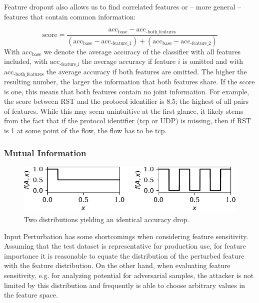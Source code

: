 \documentclass[conference]{IEEEtran}
\begin{document}
Feature dropout also allows us to find correlated features or -- more general -- features that contain common information: 

\begin{equation}
\text{score} = \frac{\text{acc}_\text{base}-\text{acc}_\text{-both\_features}}{\left(\text{acc}_\text{base}-\text{acc}_\text{-feature\_1}\right) + \left(\text{acc}_\text{base}-\text{acc}_\text{-feature\_2}\right)}
\end{equation}
With $\text{acc}_\text{base}$ we denote the average accuracy of the classifier with all features included, with $\text{acc}_\text{-feature\_i}$ the average accuracy if feature $i$ is omitted and with $\text{acc}_\text{-both\_features}$ the average accuracy if both features are omitted. The higher the resulting number, the larger the information that both features share. If the score is one, this means that both features contain no joint information. For example, the score between RST and the protocol identifier is 8.5; the highest of all pairs of features. While this may seem unintuitive at the first glance, it likely stems from the fact that if the protocol identifier (\gls{tcp} or UDP) is missing, then if RST is 1 at some point of the flow, the flow has to be \gls{tcp}.

\subsubsection{Mutual Information}
\begin{figure}
\includegraphics[width=\columnwidth]{../plots/mutinfo_example.pdf}
\caption{Two distributions yielding an identical accuracy drop.}
\label{fig:mutinfo_example}
\end{figure}
Input Perturbation has some shortcomings when considering feature sensitivity. Assuming that the test dataset is representative for production use, for feature importance it is reasonable to equate the distribution of the perturbed feature with the feature distribution. On the other hand, when evaluating feature sensitivity, e.g. for analyzing potential for adversarial samples, the attacker is not limited by this distribution and frequently is able to choose arbitrary values in the feature space.
\end{document}
